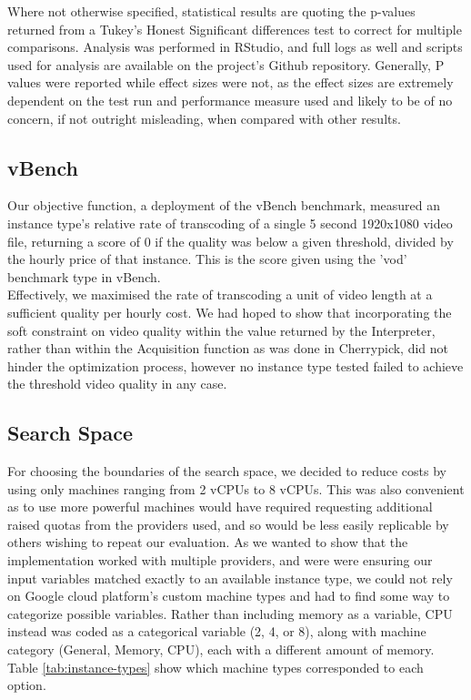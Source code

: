 \documentclass{report}
\begin{document}
Where not otherwise specified, statistical results are quoting the p-values returned from a Tukey's Honest Significant differences test to correct for multiple comparisons. Analysis was performed in RStudio\cite{RCoreTeam2018,RStudioTeam2016}, and full logs as well and scripts used for analysis are available on the project's Github repository. Generally, P values were reported while effect sizes were not, as the effect sizes are extremely dependent on the test run and performance measure used and likely to be of no concern, if not outright misleading, when compared with other results.

\subsection{vBench}
Our objective function, a deployment of the vBench benchmark, measured an instance type's relative rate of transcoding of a single 5 second 1920x1080 video file, returning a score of 0 if the quality was below a given threshold, divided by the hourly price of that instance. This is the score given using the 'vod' benchmark type in vBench.\\
Effectively, we maximised the rate of transcoding a unit of video length at a sufficient quality per hourly cost. We had hoped to show that incorporating the soft constraint on video quality within the value returned by the Interpreter, rather than within the Acquisition function as was done in Cherrypick, did not hinder the optimization process, however no instance type tested failed to achieve the threshold video quality in any case.

\subsection{Search Space}
For choosing the boundaries of the search space, we decided to reduce costs by using only machines ranging from 2 vCPUs to 8 vCPUs. This was also convenient as to use more powerful machines would have required requesting additional raised quotas from the providers used, and so would be less easily replicable by others wishing to repeat our evaluation. As we wanted to show that the implementation worked with multiple providers, and were were ensuring our input variables matched exactly to an available instance type, we could not rely on Google cloud platform's custom machine types and had to find some way to categorize possible variables. Rather than including memory as a variable, CPU instead was coded as a categorical variable (2, 4, or 8), along with machine category (General, Memory, CPU), each with a different amount of memory. Table \ref{tab:instance-types} show which machine types corresponded to each option. 
\end{document}
